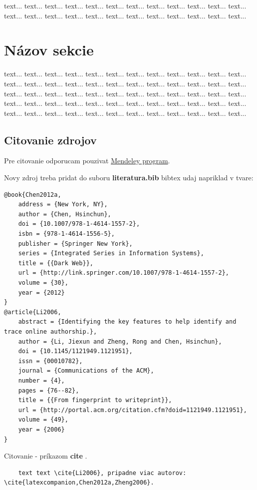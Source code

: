  text...  text...  text...  text...  text...  text...  text...  text...  text...  text...  text...  text...  text...  text...  text...  text...  text...  text...  text...  text...  text...  text...  text...  text...

\section{Názov sekcie}

 text...  text...  text...  text...  text...  text...  text...  text...  text...  text...  text...  text...  text...  text...  text...  text...  text...  text...  text...  text...  text...  text...  text...  text...  text...  text...  text...  text...  text...  text...  text...  text...  text...  text...  text...  text...  text...  text...  text...  text...  text...  text...  text...  text...  text...  text...  text...  text...  text...  text...  text...  text...  text...  text...  text...  text...  text...  text...  text...  text...


\subsection{Citovanie zdrojov}
Pre citovanie odporucam pouzivat \href{https://www.mendeley.com}{Mendeley program}.

Novy zdroj treba pridat do suboru \textbf{literatura.bib} bibtex udaj napriklad v tvare:
\begin{verbatim}
@book{Chen2012a,
    address = {New York, NY},
    author = {Chen, Hsinchun},
    doi = {10.1007/978-1-4614-1557-2},
    isbn = {978-1-4614-1556-5},
    publisher = {Springer New York},
    series = {Integrated Series in Information Systems},
    title = {{Dark Web}},
    url = {http://link.springer.com/10.1007/978-1-4614-1557-2},
    volume = {30},
    year = {2012}
}
@article{Li2006,
    abstract = {Identifying the key features to help identify and trace online authorship.},
    author = {Li, Jiexun and Zheng, Rong and Chen, Hsinchun},
    doi = {10.1145/1121949.1121951},
    issn = {00010782},
    journal = {Communications of the ACM},
    number = {4},
    pages = {76--82},
    title = {{From fingerprint to writeprint}},
    url = {http://portal.acm.org/citation.cfm?doid=1121949.1121951},
    volume = {49},
    year = {2006}
}
\end{verbatim}

Citovanie - príkazom \textbf{cite} \cite{Priezvisko}.
\begin{verbatim}
	text text \cite{Li2006}, pripadne viac autorov: \cite{latexcompanion,Chen2012a,Zheng2006}.
\end{verbatim}

